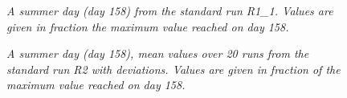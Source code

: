 		\begin{figure}[H]
			\centering
			\caption{\textit{A summer day (day 158) from the standard run R1\_1. Values are given in fraction the maximum value reached on day 158.}}
			\label{fig:day158}
		\end{figure}
		
		\begin{figure}[H]
			\centering
			\caption{\textit{A summer day (day 158), mean values over 20 runs from the standard run R2 with deviations. Values are given in fraction of the maximum value reached on day 158.}}
			\label{fig:day158variation}
		\end{figure}
	
